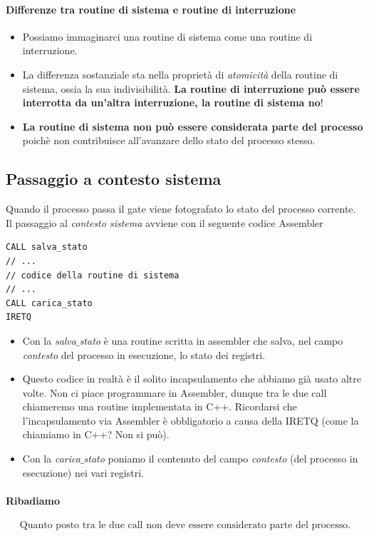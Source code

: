 \documentclass[11pt]{report}
\theoremstyle{definition}
\begin{document}
\paragraph{Differenze tra routine di sistema e routine di interruzione} 
\begin{itemize}
\item Possiamo immaginarci una routine di sistema come una routine di interruzione.
\item La differenza sostanziale sta nella proprietà di \emph{atomicità} della routine di sistema, ossia la sua indivisibilità. \textbf{La routine di interruzione può essere interrotta da un'altra interruzione, la routine di sistema no}!
\item \textbf{La routine di sistema non può essere considerata parte del processo} poichè non contribuisce all'avanzare dello stato del processo stesso.
\end{itemize}
\subsection{Passaggio a contesto sistema} Quando il processo passa il gate viene fotografato lo stato del processo corrente.  Il passaggio al \emph{contesto sistema} avviene con il seguente codice Assembler
\begin{verbatim}
CALL salva_stato
// ...
// codice della routine di sistema
// ...
CALL carica_stato
IRETQ
\end{verbatim}
\begin{itemize}
\item Con la \emph{salva$\_$stato} è una routine scritta in assembler che salva, nel campo \emph{contesto} del processo in esecuzione, lo stato dei registri.
\item Questo codice in realtà è il solito incapsulamento che abbiamo già usato altre volte. Non ci piace programmare in Assembler, dunque tra le due call chiameremo una routine implementata in C++. Ricordarsi che l'incapsulamento via Assembler è obbligatorio a causa della IRETQ (come la chiamiamo in C++? Non si può).
\item Con la \emph{carica$\_$stato} poniamo il contenuto del campo \emph{contesto} (del processo in esecuzione) nei vari registri.
\end{itemize}
\paragraph{Ribadiamo}
\[\boxed{\text{Quanto posto tra le due call non deve essere considerato parte del processo.}}\]
\end{document}
